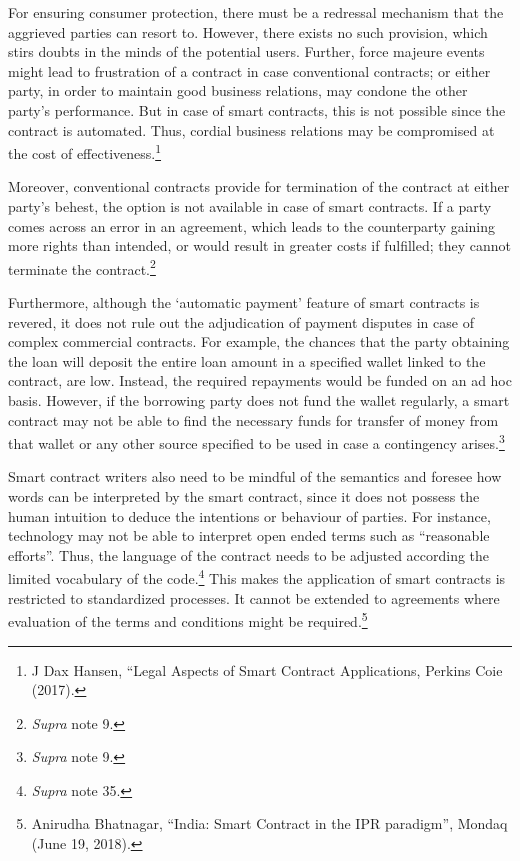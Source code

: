 \begin{multicols}{2}
\noi
For ensuring consumer protection, there must be a redressal mechanism that the aggrieved
parties can resort to. However, there exists no such provision, which stirs doubts in the minds
of the potential users. Further, force majeure events might lead to frustration of a contract in
case conventional contracts; or either party, in order to maintain good business relations, may
condone the other party’s performance. But in case of smart contracts, this is not possible
since the contract is automated. Thus, cordial business relations may be compromised at the
cost of effectiveness.\footnote{J Dax Hansen, “Legal Aspects of Smart Contract Applications, Perkins Coie (2017).}

\noi
Moreover, conventional contracts provide for termination of the contract at either party’s
behest, the option is not available in case of smart contracts. If a party comes across an error
in an agreement, which leads to the counterparty gaining more rights than intended, or would
result in greater costs if fulfilled; they cannot terminate the contract.\footnote{\textit{Supra} note 9.}

\noi
Furthermore, although the ‘automatic payment’ feature of smart contracts is revered, it does
not rule out the adjudication of payment disputes in case of complex commercial contracts.
For example, the chances that the party obtaining the loan will deposit the entire loan amount
in a specified wallet linked to the contract, are low. Instead, the required repayments would
be funded on an ad hoc basis. However, if the borrowing party does not fund the wallet
regularly, a smart contract may not be able to find the necessary funds for transfer of money
from that wallet or any other source specified to be used in case a contingency arises.\footnote{\textit{Supra} note 9.}

\vspace{-.1cm}

\noi
Smart contract writers also need to be mindful of the semantics and foresee how words can be
interpreted by the smart contract, since it does not possess the human intuition to deduce the
intentions or behaviour of parties. For instance, technology may not be able to interpret open
ended terms such as “reasonable efforts”. Thus, the language of the contract needs to be
adjusted according the limited vocabulary of the code.\footnote{\textit{Supra} note 35.} This makes the application of smart contracts is restricted to standardized processes. It cannot be extended to agreements where
evaluation of the terms and conditions might be required.\footnote{Anirudha Bhatnagar, “India: Smart Contract in the IPR paradigm”, Mondaq (June 19, 2018). }


\end{multicols}
